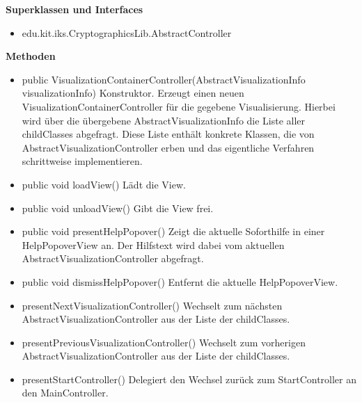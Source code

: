 \documentclass{article}
\begin{document}
      \textbf{Superklassen und Interfaces}
      \begin{itemize}
        \item edu.kit.iks.CryptographicsLib.AbstractController
      \end{itemize}
      
      \textbf{Methoden}
      \begin{itemize}
        \item public VisualizationContainerController(AbstractVisualizationInfo visualizationInfo) \newline
        Konstruktor. Erzeugt einen neuen VisualizationContainerController für die gegebene Visualisierung.
        Hierbei wird über die übergebene AbstractVisualizationInfo die Liste aller childClasses abgefragt.
        Diese Liste enthält konkrete Klassen, die von AbstractVisualizationController erben und das eigentliche Verfahren schrittweise implementieren.
        \item public void loadView() \newline
        Lädt die View.
        \item public void unloadView() \newline
        Gibt die View frei.
        \item public void presentHelpPopover() \newline
        Zeigt die aktuelle Soforthilfe in einer HelpPopoverView an. Der Hilfstext wird dabei vom aktuellen
        AbstractVisualizationController abgefragt.
        \item public void dismissHelpPopover() \newline
        Entfernt die aktuelle HelpPopoverView.
        \item presentNextVisualizationController() \newline
        Wechselt zum nächsten AbstractVisualizationController aus der Liste der childClasses.
        \item presentPreviousVisualizationController() \newline
        Wechselt zum vorherigen AbstractVisualizationController aus der Liste der childClasses.
        \item presentStartController() \newline
        Delegiert den Wechsel zurück zum StartController an den MainController.
      \end{itemize}
\end{document}
